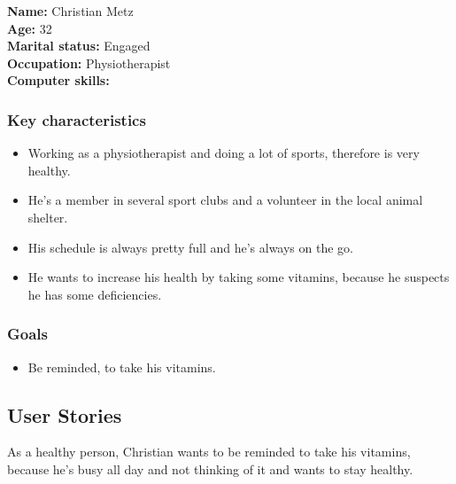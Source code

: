 \documentclass[12pt, a4paper, ngerman]{article}
\begin{document}
\textbf{Name:} Christian Metz \\
\textbf{Age:} 32 \\
\textbf{Marital status:} Engaged \\
\textbf{Occupation:} Physiotherapist \\
\textbf{Computer skills:} 
\subsubsection*{Key characteristics}

\begin{itemize}[noitemsep]
	\item Working as a physiotherapist and doing a lot of sports, therefore is very healthy.
	\item He's a member in several sport clubs and a volunteer in the local animal shelter.
	\item His schedule is always pretty full and he's always on the go.
	\item He wants to increase his health by taking some vitamins, because he suspects he has some deficiencies.
\end{itemize}

\subsubsection*{Goals}

\begin{itemize}[noitemsep]
	\item Be reminded, to take his vitamins.
\end{itemize}


\subsection*{User Stories}

As a healthy person, Christian wants to be reminded to take his vitamins, because he's busy all day and not thinking of it and wants to stay healthy.
\end{document}
